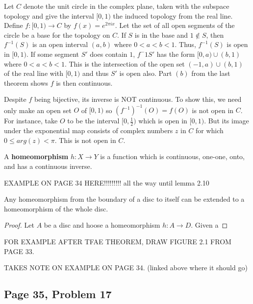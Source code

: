 \begin{example}
    Let $C$ denote the unit circle in the complex plane, taken with the subspace topology and give the interval $[0, 1)$ the induced topology from the real line. Define $f\colon[0,1)\to C$ by $f(x) = e^{2\pi ix}$. Let the set of all open segments of the circle be a base for the topology on $C$. If $S$ is in the base and $1 \notin S$, then $f^{-1}(S)$ is an open interval $(a,b)$ where $0<a<b<1$. Thus, $f^{-1}(S)$ is open in $[0,1)$. If some segment $S'$ does contain $1$, $f^-1{S'}$ has the form $[0,a)\cup(b,1)$ where $0<a<b<1$. This is the intersection of the open set $(-1,a)\cup(b,1)$ of the real line with $[0,1)$ and thus $S'$ is open also. Part $(b)$ from the last theorem shows $f$ is then continuous. 
    
    Despite $f$ being bijective, its inverse is NOT continuous. To show this, we need only make an open set $O$ of $[0,1)$ so $(f^{-1})^{-1}(O) = f(O)$ is not open in $C$. For instance, take $O$ to be the interval $[0, \frac{1}{2})$ which is open in $[0,1)$. But its image under the exponential map consists of complex numbers $z$ in $C$ for which $0 \leq arg(z) < \pi$. This is not open in $C$.
\end{example}
\begin{definition}[Homeomorphism]
    A \textbf{homeomorphism} $h\colon X\to Y$ is a function which is continuous, one-one, onto, and has a continuous inverse. 
\end{definition}
\begin{example}
    EXAMPLE ON PAGE 34 HERE!!!!!!!!! all the way until lemma 2.10
\end{example}
\begin{lemma}
    Any homeomorphism from the boundary of a disc to itself can be extended to a homeomorphism of the whole disc.
\end{lemma}
\begin{proof}
    Let $A$ be a disc and hoose a homeomorphism $h \colon A \to D$. Given a 
\end{proof}

FOR EXAMPLE AFTER TFAE THEOREM, DRAW FIGURE 2.1 FROM PAGE 33.

TAKES NOTE ON EXAMPLE ON PAGE 34. (linked above where it should go)




\subsection*{Page 35, Problem 17}

